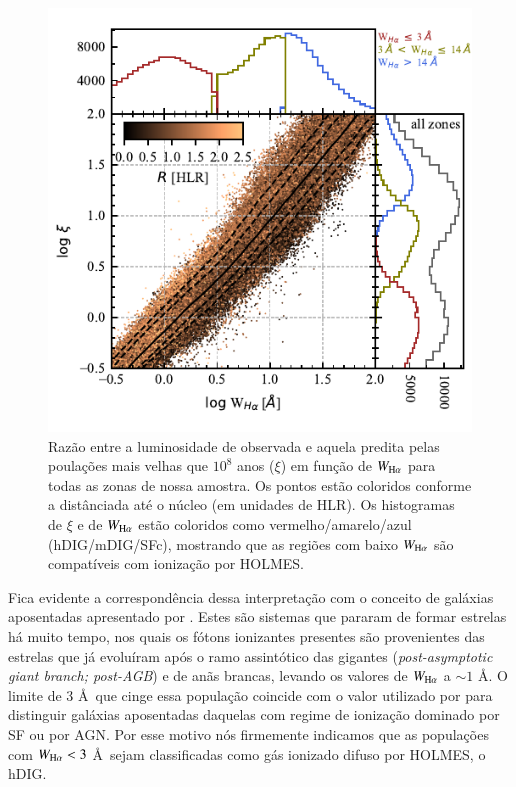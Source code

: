 \begin{figure}
 \includegraphics[scale=1.5]{figuras/fig_logxi_logWHa_histograms.pdf}
 \caption[$\log \xi \times \log {\rm H}\alpha$]
 {Razão entre a luminosidade de \Ha observada e aquela predita pelas poulações mais velhas que $10^8$ anos ($\xi$) em função de $W_{\Ha}$ para todas as zonas de nossa amostra. Os pontos estão coloridos conforme a distânciada até o núcleo (em unidades de HLR). Os histogramas de $\xi$ e de $W_{\Ha}$ estão coloridos como vermelho/amarelo/azul (hDIG/mDIG/SFc), mostrando que as regiões com baixo $W_{\Ha}$ são compatíveis com ionização por HOLMES.}
 \label{fig:WHa-Xi}
\end{figure}

Fica evidente a correspondência dessa interpretação com o conceito de galáxias aposentadas apresentado por \citet{Stasinska.etal.2008a}. Estes são sistemas que pararam de formar estrelas há muito tempo, nos quais os fótons ionizantes presentes são provenientes das estrelas que já evoluíram após o ramo assintótico das gigantes ({\em post-asymptotic giant branch; post-AGB}) e de anãs brancas, levando os valores de $W_{\Ha}$ a $\sim 1$ \AA. O limite de 3 \AA\ que cinge essa população coincide com o valor utilizado por \citet{CidFernandes.etal.2011a} para distinguir galáxias aposentadas daquelas com regime de ionização dominado por SF ou por AGN. Por esse motivo nós firmemente indicamos que as populações com $W_{\Ha} < 3$ \AA\ sejam classificadas como gás ionizado difuso por HOLMES, o hDIG.

